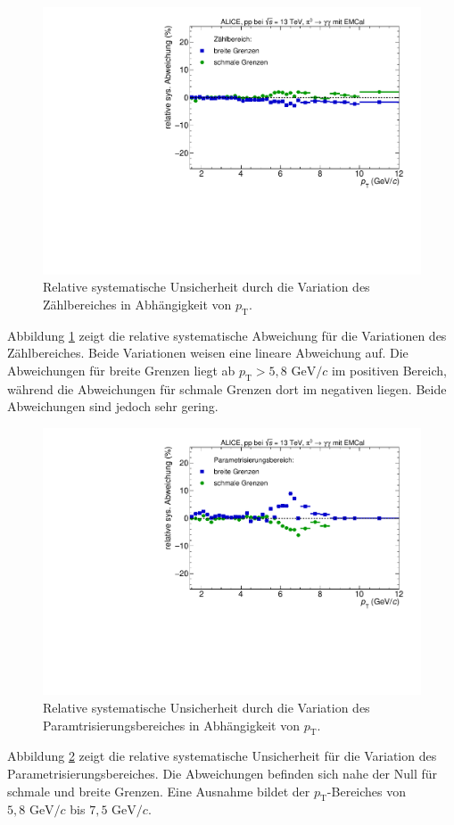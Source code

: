 \begin{figure}[t!]
\centering
\includegraphics[width=.65\linewidth]{YieldsSysUncerIntRange_Data_2016.pdf}
\caption{Relative systematische Unsicherheit durch die Variation des Zählbereiches in Abhängigkeit von $p_\text{T}$.}
\label{fig:IntSys}
\end{figure}
\newline
Abbildung \ref{fig:IntSys} zeigt die relative systematische Abweichung für die Variationen des Zählbereiches.
Beide Variationen weisen eine lineare Abweichung auf.
Die Abweichungen für breite Grenzen liegt ab $p_\text{T} > 5,8 \text{ GeV}/c$ im positiven Bereich, während die Abweichungen für schmale Grenzen dort im negativen liegen.
Beide Abweichungen sind jedoch sehr gering.
\begin{figure}[t!]
\centering
\includegraphics[width=.65\linewidth]{YieldsSysUncerFitRange_Data_2016.pdf}
\caption{Relative systematische Unsicherheit durch die Variation des Paramtrisierungsbereiches in Abhängigkeit von $p_\text{T}$.}
\label{fig:ParamSys}
\end{figure}
\newline
Abbildung \ref{fig:ParamSys} zeigt die relative systematische Unsicherheit für die Variation des Parametrisierungsbereiches.
Die Abweichungen befinden sich nahe der Null für schmale und breite Grenzen.
Eine Ausnahme bildet der $p_\text{T}$-Bereiches von $5,8 \text{ GeV}/c$ bis $7,5 \text{ GeV}/c$.
